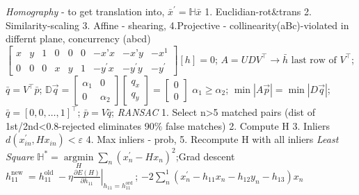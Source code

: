 \documentclass[a4paper]{article}
\newcommand*\circled[1]{\tikz[baseline=(char.base)]{
            \node[shape=circle,draw,inner sep=0.5pt] (char) {#1};}}
\begin{document}
\textit{Homography} - to get translation into, $
\bar{x}^{\prime}=\mathbb{H} \bar{x}
$
1. Euclidian-rot&trans 2. Similarity-scaling 3. Affine - shearing, 4.Projective - collinearity(aBc)-violated in differnt plane, concurrency (abcd)
$
\left[\begin{array}{ccccccccc}{x} & {y} & {1} & {0} & {0} & {0} & {-x’x}&{-x’ y} & {-x^{1}} \\ {0} & {0}&{0} & {x}&{y}&{1} & {-y^{\prime} x} & {-y^{\prime} y} & {-y^{\prime}}\end{array}\right][h]=0
$;
$
A=UDV^{\top} \rightarrow \bar{h} \text { last row of } V^{\top}
$;
$
\bar{q}=V^{\top} \bar{p}
$;
$
\mathbb{D} \vec{q}=\left[\begin{array}{ll}{\alpha_{1}} & {0} \\ {0} & {\alpha_{2}}\end{array}\right]\left[\begin{array}{l}{q_{x}} \\ {q_{y}}\end{array}\right]=\left[\begin{array}{l}{0} \\ {0}\end{array}\right]
$
$
\alpha_{1} \geq \alpha_{2}
$;
$
\min |A \vec{p}|=\min |D\vec{q}|
$;
$
\bar{q}=[0,0, \ldots,1]^{\top}
$;
$
\bar{p}=V \bar{q}
$;
\circled{6}\textit{RANSAC}
1. Select n>5 matched pairs (dist of 1st/2nd<0.8-rejected eliminates 90$\%$ false matches) 2. Compute H 3. Inliers $
d\left(x_{i n}^{\prime}, H x_{i n}\right)<\varepsilon
$
4. Max inliers - prob, 5. Recompute H with all inliers
\circled{6}\textit{Least Square}
$
\mathbb{H}^{*}=\underset{H}{\operatorname{argmin}} \sum_{n}\left(x_{n}^{\prime}-H x_{n}\right)^{2}
$;Grad descent
$
h_{11}^{\text {new }}=h_{11}^{\text {old }}-\left.\eta \frac{\partial E(H)}{\partial h_{11}}\right|_{h_{11}=h_{11}^{\text {ord }}}
$;
$
-2 \sum_{n}^{1}\left(x_{n}^{\prime}-h_{11} x_{n}-h_{12} y_{n}-h_{13}\right) x_{n}
$
\end{document}
